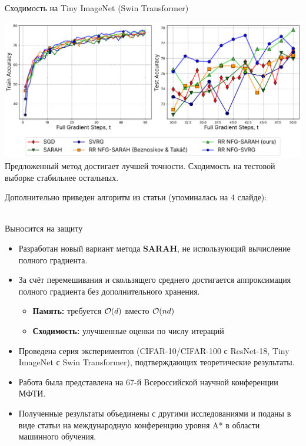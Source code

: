 \documentclass{beamer}
\theoremstyle{plain}
\begin{document}
\begin{frame}{Сходимость на  Tiny ImageNet (Swin Transformer)}
    \begin{center}
    \includegraphics[width=\linewidth]{../figures/vit_results.pdf}
    \scriptsize
    Предложенный метод достигает лучшей точности. Сходимость на тестовой выборке стабильнее остальных.
    \end{center}
    \vspace{1em}
    \scriptsize
    Дополнительно приведен алгоритм из статьи (упоминалась на 4 слайде):\\
    \faBook~
\end{frame}

    
\begin{frame}{Выносится на защиту}
    \begin{itemize}
        \item Разработан новый вариант метода \textbf{SARAH}, не использующий вычисление полного градиента.
        \item За счёт перемешивания и скользящего среднего достигается аппроксимация полного градиента без дополнительного хранения.
        \begin{itemize}
            \item \textbf{Память:} требуется \(\order{d}\) вместо \(\order{nd}\)
            \item \textbf{Сходимость:} улучшенные оценки по числу итераций
        \end{itemize}
        \item Проведена серия экспериментов (CIFAR-10/CIFAR-100 с ResNet-18, Tiny ImageNet с Swin Transformer), подтверждающих теоретические результаты.
        \item Работа была представлена на 67-й Всероссийской научной конференции МФТИ.
        \item Полученные результаты объединены с другими исследованиями и поданы в виде статьи на международную конференцию уровня A* в области машинного обучения.
    \end{itemize}
\end{frame}



    
\end{document}

